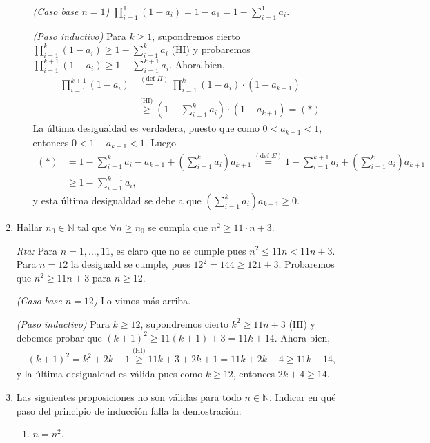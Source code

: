 \documentclass[12pt,spanish,makeidx]{amsbook}
\newcommand{\rta}{\noindent\textit{Rta: }}
\begin{document}
\begin{enumerate}
\begin{enumerate}
			\textit{(Caso base $n=1$) } $\prod_{i=1}^{1} (1-a_i) = 1-a_1 = 1 - \sum_{i=1}^{1} a_i$.
			
			\textit{(Paso inductivo) }  Para  $k \ge 1$,  supondremos cierto  $\prod_{i=1}^{k} (1-a_i) \ge 1 - \sum_{i=1}^{k} a_i$ (HI) y probaremos  $\prod_{i=1}^{k+1} (1-a_i) \ge 1 - \sum_{i=1}^{k+1} a_i$. Ahora bien, 
			\begin{align*}
			\prod_{i=1}^{k+1} (1-a_i) &\overset{(\text{def } \Pi)}{=\quad} \prod_{i=1}^{k} (1-a_i)\cdot (1-a_{k+1})\\
			&\overset{\text{(HI)}}{\ge}  (1 - \sum_{i=1}^{k} a_i)\cdot (1-a_{k+1}) =(*)
			\end{align*}
			La última desigualdad es verdadera, puesto  que como $0<a_{k+1}<1$, entonces $0<1-a_{k+1}<1$. 
			Luego
			\begin{align*}
				(*)&= 1 - \sum_{i=1}^{k} a_i -a_{k+1} +  (\sum_{i=1}^{k} a_i)a_{k+1} \overset{(\text{def } \Sigma)}{=} 1 - \sum_{i=1}^{k+1} a_i +  (\sum_{i=1}^{k} a_i)a_{k+1} \\
				&\ge  1 - \sum_{i=1}^{k+1} a_i,
			\end{align*}
			y  esta última desigualdad se debe a que $(\sum_{i=1}^{k} a_i)a_{k+1} \ge 0$.
		\end{enumerate}
		
		\medskip
		
		
		
		
		\item Hallar $n_0 \in {\mathbb N}$ tal que $\forall n \ge n_0$ se cumpla que $n^2 \ge 11 \cdot n + 3$.
		
		\rta Para $n=1,\ldots,11$,  es claro que no se cumple pues $n^2 \le 11n < 11n +3$. Para $n =12$ la desiguald se cumple, pues $12^2 = 144 \ge 121+3$.   Probaremos  que $n^2 \ge 11  n + 3$ para $n\ge 12$. 
		
			\textit{(Caso base $n=12$) } Lo vimos más arriba.
			
			\textit{(Paso inductivo) }  Para  $k \ge 12$,  supondremos cierto $k^2 \ge 11  n + 3$ (HI) y debemos probar que $(k+1)^2 \ge 11  (k+1) + 3 =11k +14$. Ahora bien, 
			\begin{align*}
				(k+1)^2 = k^2+2k+1 \overset{\text{(HI)}}{\ge} 11k+3 +2k+1 = 11k + 2k+ 4 \ge 11k +14, 
			\end{align*}
			y la última desigualdad es válida pues como  $k\ge 12$,  entonces $2k+ 4 \ge 14$.
		
		\smallskip
		
		
		\item Las siguientes proposiciones no son válidas para todo $n \in {\mathbb N}$. Indicar en qué paso del principio de inducción falla la demostración:
			\begin{enumerate}
				\item  $n=n^2$.
				

\end{enumerate}
\end{enumerate}
\end{document}
